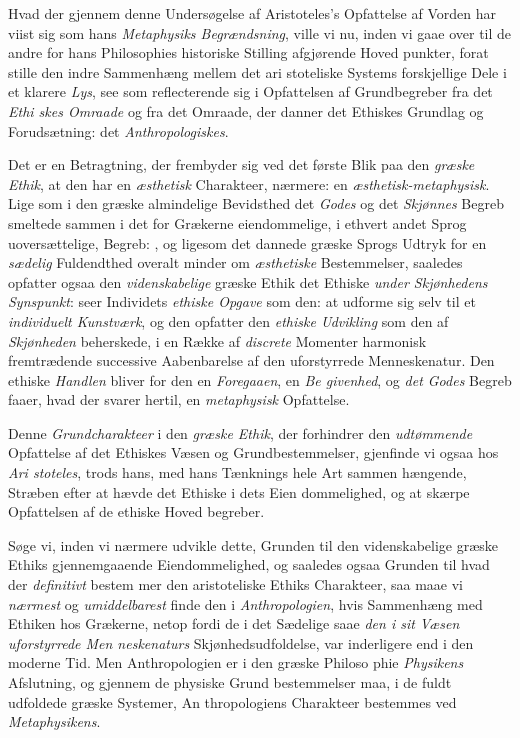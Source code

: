 Hvad der gjennem denne Undersøgelse af Aristoteles's
Opfattelse af Vorden har viist sig som hans \emph{Metaphysiks
Begrændsning}, ville vi nu, inden vi gaae over til de andre
for hans Philosophies historiske Stilling afgjørende Hoved\-%
punkter, forat stille den indre Sammenhæng mellem det ari\-%
stoteliske Systems forskjellige Dele i et klarere \emph{Lys}, see som
reflecterende sig i Opfattelsen af Grundbegreber fra det \emph{Ethi\-%
skes Omraade} og fra det Omraade, der danner det Ethiskes
Grundlag og Forudsætning: det \emph{Anthropologiskes}.

Det er en Betragtning, der frembyder sig ved det første
Blik paa den \emph{græske Ethik}, at den har en \emph{æsthetisk}
Charakteer, nærmere: en \emph{æsthetisk-metaphysisk}. Lige\-%
som i den græske almindelige Bevidsthed det \emph{Godes} og det
\emph{Skjønnes} Begreb smeltede sammen i det for Grækerne
eiendommelige, i ethvert andet Sprog uoversættelige, Begreb:
, og ligesom det dannede græske Sprogs Udtryk
for en \emph{sædelig} Fuldendthed overalt minder om \emph{æsthetiske}
Bestemmelser, saaledes opfatter ogsaa den \emph{videnskabelige}
græske Ethik det Ethiske \emph{under Skjønhedens Synspunkt}:
seer Individets \emph{ethiske Opgave} som den: at udforme sig
selv til et \emph{individuelt Kunstværk}, og den opfatter den
\emph{ethiske Udvikling} som den af \emph{Skjønheden} beherskede,
i en Række af \emph{discrete} Momenter harmonisk fremtrædende
successive Aabenbarelse af den uforstyrrede Menneskenatur.
Den ethiske \emph{Handlen} bliver for den en \emph{Foregaaen}, en \emph{Be\-%
givenhed}, og \emph{det Godes} Begreb faaer, hvad der svarer
hertil, en \emph{metaphysisk} Opfattelse.

Denne \emph{Grundcharakteer} i den \emph{græske Ethik}, der
forhindrer den \emph{udtømmende} Opfattelse af det Ethiskes
Væsen og Grundbestemmelser, gjenfinde vi ogsaa hos \emph{Ari\-%
stoteles}, trods hans, med hans Tænknings hele Art sammen\-%
hængende, Stræben efter at hævde det Ethiske i dets Eien\-%
dommelighed, og at skærpe Opfattelsen af de ethiske Hoved\-%
begreber.

Søge vi, inden vi nærmere udvikle dette, Grunden til den
videnskabelige græske Ethiks gjennemgaaende Eiendommelighed,
og saaledes ogsaa Grunden til hvad der \emph{definitivt} bestem\-%
mer den aristoteliske Ethiks Charakteer, saa maae vi \emph{nærmest}
og \emph{umiddelbarest} finde den i \emph{Anthropologien}, hvis
Sammenhæng med Ethiken hos Grækerne, netop fordi de i
det Sædelige saae \emph{den i sit Væsen uforstyrrede Men\-%
neskenaturs} Skjønhedsudfoldelse, var inderligere end i den
moderne Tid. Men Anthropologien er i den græske Philoso\-%
phie \emph{Physikens} Afslutning, og gjennem de physiske Grund\-%
bestemmelser maa, i de fuldt udfoldede græske Systemer, An\-%
thropologiens Charakteer bestemmes ved \emph{Metaphysikens}.

